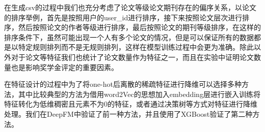 在生成csv的过程中我们也充分考虑了论文等级论文期刊存在的偏序关系，以论文的排序举例，首先是按照用户的user\_id进行排序，接下来按照论文层次进行排序，然后按照论文的作者等级进行排序，最后按照论文的期刊等级排序，在这样的排序条件下，虽然可能出现一个人有多个论文的情况，但是可以保证所有的数据都是以特定规则排列而不是无规则排列，这样在模型训练过程中会更为准确。除此以外对于论文等特征我们也统计了论文数量作为特征之一，而且在实验中证明论文数量也是影响奖学金评定的重要因素。

在特征设计的过程中为了将one-hot后离散的稀疏特征进行降维可以选择多种方法，其中比较典型的方法为借用word2Vec的思想加入embedding层进行嵌入训练将特征转化为低维稠密且元素不为0的特征，或者通过决策树等方式对特征进行降维处理。我们在DeepFM中验证了前一种方法，并且使用了XGBoost验证了第二种方法。

